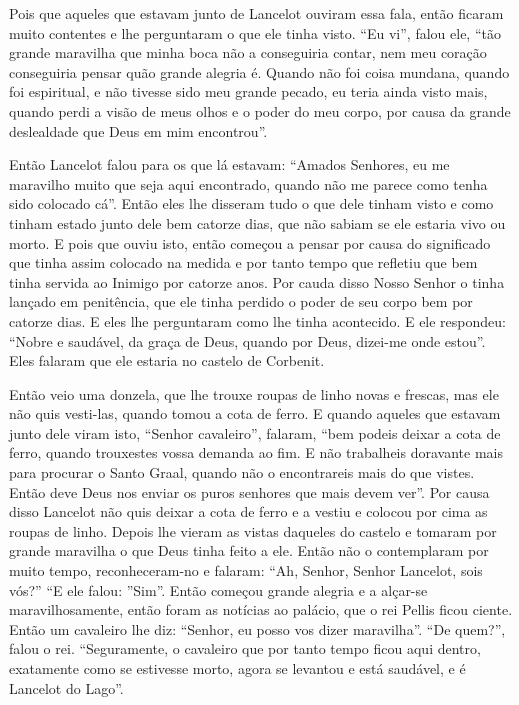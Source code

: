 Pois que aqueles que estavam junto de Lancelot ouviram essa fala, então ficaram
muito contentes e lhe perguntaram o que ele tinha visto. “Eu vi”, falou ele,
“tão grande maravilha que minha boca não a conseguiria contar, nem meu coração
conseguiria pensar quão grande alegria é. Quando não foi coisa mundana, quando
foi espiritual, e não tivesse sido meu grande pecado, eu teria ainda visto
mais, quando perdi a visão de meus olhos e o poder do meu corpo, por causa da
grande deslealdade que Deus em mim encontrou”. 

Então Lancelot falou para os que lá estavam: “Amados Senhores, eu me maravilho
muito que seja aqui encontrado, quando não me parece como tenha sido colocado
cá”. Então eles lhe disseram tudo o que dele tinham visto e como tinham estado
junto dele bem catorze dias, que não sabiam se ele estaria vivo ou morto. E
pois que ouviu isto, então começou a pensar por causa do significado que tinha
assim colocado na medida e por tanto tempo que refletiu que bem tinha servida
ao Inimigo por catorze anos. Por cauda disso Nosso Senhor o tinha lançado em
penitência, que ele tinha perdido o poder de seu corpo bem por catorze dias. 
E eles lhe perguntaram como lhe tinha acontecido. E ele respondeu: “Nobre
e saudável, da graça de Deus, quando por Deus, dizei-me onde estou”. Eles
falaram que ele estaria no castelo de Corbenit. 

Então veio uma donzela, que lhe trouxe roupas de linho novas e frescas, mas ele
não quis vesti-las, quando tomou a cota de ferro. E quando aqueles que estavam
junto dele viram isto, “Senhor cavaleiro”, falaram, “bem podeis deixar a cota
de ferro, quando trouxestes vossa demanda ao fim. E não trabalheis doravante
mais para procurar o Santo Graal, quando não o encontrareis mais do que vistes.
Então deve Deus nos enviar os puros senhores que mais devem ver”. Por causa
disso Lancelot não quis deixar a cota de ferro e a vestiu e colocou por cima
as roupas de linho. Depois lhe vieram as vistas daqueles do castelo e tomaram
por grande maravilha o que Deus tinha feito a ele. Então não o contemplaram por
muito tempo, reconheceram-no e falaram: “Ah, Senhor, Senhor Lancelot, sois
vós?” “E ele falou: ”Sim”. Então começou grande alegria e a alçar-se
maravilhosamente, então foram as notícias ao palácio, que o rei Pellis ficou
ciente. Então um cavaleiro lhe diz: “Senhor, eu posso vos dizer maravilha”. “De
quem?”, falou o rei. “Seguramente, o cavaleiro que por tanto tempo ficou aqui
dentro, exatamente como se estivesse morto, agora se levantou e está saudável,
e é Lancelot do Lago”.

